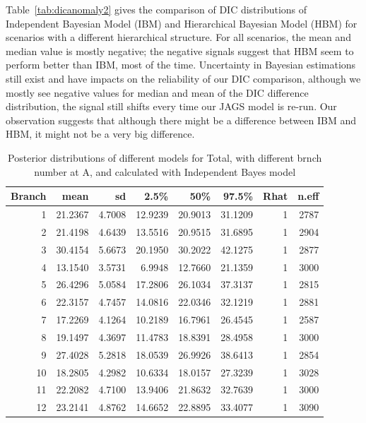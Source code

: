 Table~\ref{tab:dicanomaly2} gives the comparison of DIC distributions of Independent Bayesian Model (IBM) and Hierarchical Bayesian Model (HBM) for scenarios with a different hierarchical structure. For all scenarios, the mean and median value is mostly negative; the negative signals suggest that HBM seem to perform better than IBM, most of the time. Uncertainty in Bayesian estimations still exist and have impacts on the reliability of our DIC comparison, although we mostly see negative values for median and mean of the DIC difference distribution, the signal still shifts every time our JAGS model is re-run. Our observation suggests that although there might be a difference between IBM and HBM, it might not be a very big difference. 

\newpage 

\begin{table}[!t]
	\centering
	\begin{tabular}{rrrrrrrr}
		\hline
		Branch & mean & sd & 2.5\% & 50\% & 97.5\% & Rhat & n.eff \\ 
		\hline
		1 & 21.2367 & 4.7008 & 12.9239 & 20.9013 & 31.1209 & 1 & 2787 \\ 
		2 & 21.4198 & 4.6439 & 13.5516 & 20.9515 & 31.6895 & 1 & 2904 \\ 
		3 & 30.4154 & 5.6673 & 20.1950 & 30.2022 & 42.1275 & 1 & 2877 \\ 
		4 & 13.1540 & 3.5731 & 6.9948 & 12.7660 & 21.1359 & 1 & 3000 \\ 
		5 & 26.4296 & 5.0584 & 17.2806 & 26.1034 & 37.3137 & 1 & 2815 \\ 
		6 & 22.3157 & 4.7457 & 14.0816 & 22.0346 & 32.1219 & 1 & 2881 \\ 
		7 & 17.2269 & 4.1264 & 10.2189 & 16.7961 & 26.4545 & 1 & 2587 \\ 
		8 & 19.1497 & 4.3697 & 11.4783 & 18.8391 & 28.4958 & 1 & 3000\\ 
		9 & 27.4028 & 5.2818 & 18.0539 & 26.9926 & 38.6413 & 1 & 2854 \\ 
		10 & 18.2805 & 4.2982 & 10.6334 & 18.0157 & 27.3239 & 1 & 3028 \\ 
		11 & 22.2082 & 4.7100 & 13.9406 & 21.8632 & 32.7639 & 1 & 3000 \\ 
		12 & 23.2141 & 4.8762 & 14.6652 & 22.8895 & 33.4077 & 1 & 3090 \\ 
		\hline
	\end{tabular}
	\caption{Posterior distributions of different models for Total, with different brnch number at A, and calculated with Independent Bayes model} 
	\label{tab:pstprototal}
\end{table}

